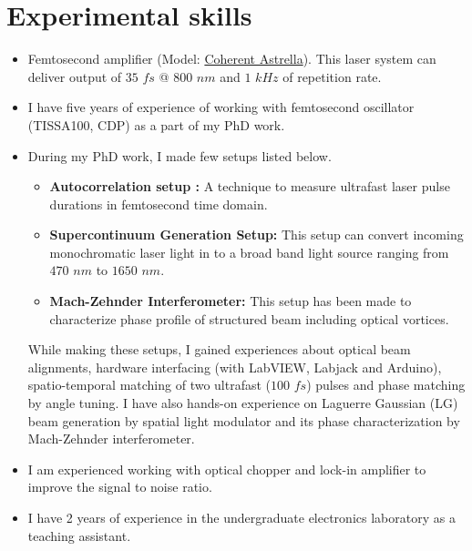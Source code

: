 \documentclass[11pt,a4paper,sans]{moderncv}        %
\begin{document}
\section{Experimental skills}
\begin{itemize}
	\item{ Femtosecond amplifier (Model: \href{https://www.coherent.com/lasers/amplifiers/astrella}{\color{blue}Coherent Astrella}). This laser system can deliver output of $35$ $fs$ @ $800$ $nm$ and $1$ $kHz$ of repetition rate.}
	
	\vspace{4pt}
	
	\item{I have five years of experience of working with femtosecond oscillator (TISSA100, CDP) as a part of my PhD work.}
	
	
	\vspace{4pt}
	
	
	\item{During my PhD work, I made few setups listed below.
		\vspace{3pt}
		\begin{itemize}
			\item{\textbf{Autocorrelation setup :} A technique to measure ultrafast laser pulse durations in femtosecond time domain.}
			\item{\textbf{Supercontinuum Generation Setup:} This setup can convert incoming monochromatic laser light in to a broad band light source ranging from $470$ $nm$ to $1650$ $nm$.}
			\item{\textbf{Mach-Zehnder Interferometer:} This setup has been made to characterize phase profile of structured beam including optical vortices.}
		\end{itemize}	
		\vspace{3pt}
		
		While making these setups, I gained experiences about optical beam alignments, hardware interfacing (with LabVIEW, Labjack and Arduino), spatio-temporal matching of two ultrafast ($100$ $fs$) pulses and phase matching by angle tuning. I have also hands-on experience on Laguerre Gaussian (LG) beam generation by spatial light modulator and its phase characterization by Mach-Zehnder interferometer.}
	
	\vspace{4pt}
	

	\item{I am experienced working with optical chopper and lock-in amplifier to improve the signal to noise ratio.}
	
	\vspace{4pt}
	
	\item{I have 2 years of experience in the undergraduate electronics laboratory as a teaching assistant.}
\end{itemize}
\end{document}
